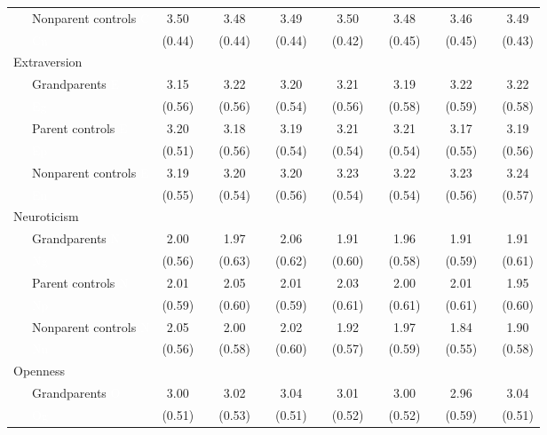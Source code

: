 \documentclass[
  english,
  man, noextraspace]{apa7}
\newenvironment{lltable}{\begin{landscape}\begin{center}\begin{ThreePartTable}}{\end{ThreePartTable}\end{center}\end{landscape}}
\begin{document}
\begin{appendix}
\begin{lltable}
{\begin{longtable}{lccccccccccccc}
\ \ \ Nonparent controls \textcolor{white}{C} & 3.50 &  & 3.48 &  & 3.49 &  & 3.50 &  & 3.48 &  & 3.46 &  & 3.49\\
\ \ \ \textcolor{white}{Cn} & (0.44) &  & (0.44) &  & (0.44) &  & (0.42) &  & (0.45) &  & (0.45) &  & (0.43)\\
Extraversion &  &  &  &  &  &  &  &  &  &  &  &  & \\
\ \ \ Grandparents \textcolor{white}{E} & 3.15 &  & 3.22 &  & 3.20 &  & 3.21 &  & 3.19 &  & 3.22 &  & 3.22\\
\ \ \ \textcolor{white}{Eg} & (0.56) &  & (0.56) &  & (0.54) &  & (0.56) &  & (0.58) &  & (0.59) &  & (0.58)\\
\ \ \ Parent controls \textcolor{white}{E} & 3.20 &  & 3.18 &  & 3.19 &  & 3.21 &  & 3.21 &  & 3.17 &  & 3.19\\
\ \ \ \textcolor{white}{Ep} & (0.51) &  & (0.56) &  & (0.54) &  & (0.54) &  & (0.54) &  & (0.55) &  & (0.56)\\
\ \ \ Nonparent controls \textcolor{white}{E} & 3.19 &  & 3.20 &  & 3.20 &  & 3.23 &  & 3.22 &  & 3.23 &  & 3.24\\
\ \ \ \textcolor{white}{En} & (0.55) &  & (0.54) &  & (0.56) &  & (0.54) &  & (0.54) &  & (0.56) &  & (0.57)\\
Neuroticism &  &  &  &  &  &  &  &  &  &  &  &  & \\
\ \ \ Grandparents \textcolor{white}{N} & 2.00 &  & 1.97 &  & 2.06 &  & 1.91 &  & 1.96 &  & 1.91 &  & 1.91\\
\ \ \ \textcolor{white}{Ng} & (0.56) &  & (0.63) &  & (0.62) &  & (0.60) &  & (0.58) &  & (0.59) &  & (0.61)\\
\ \ \ Parent controls \textcolor{white}{N} & 2.01 &  & 2.05 &  & 2.01 &  & 2.03 &  & 2.00 &  & 2.01 &  & 1.95\\
\ \ \ \textcolor{white}{Np} & (0.59) &  & (0.60) &  & (0.59) &  & (0.61) &  & (0.61) &  & (0.61) &  & (0.60)\\
\ \ \ Nonparent controls \textcolor{white}{N} & 2.05 &  & 2.00 &  & 2.02 &  & 1.92 &  & 1.97 &  & 1.84 &  & 1.90\\
\ \ \ \textcolor{white}{Nn} & (0.56) &  & (0.58) &  & (0.60) &  & (0.57) &  & (0.59) &  & (0.55) &  & (0.58)\\
Openness &  &  &  &  &  &  &  &  &  &  &  &  & \\
\ \ \ Grandparents \textcolor{white}{O} & 3.00 &  & 3.02 &  & 3.04 &  & 3.01 &  & 3.00 &  & 2.96 &  & 3.04\\
\ \ \ \textcolor{white}{Og} & (0.51) &  & (0.53) &  & (0.51) &  & (0.52) &  & (0.52) &  & (0.59) &  & (0.51)\\

\end{longtable}}
\end{lltable}
\end{appendix}
\end{document}
